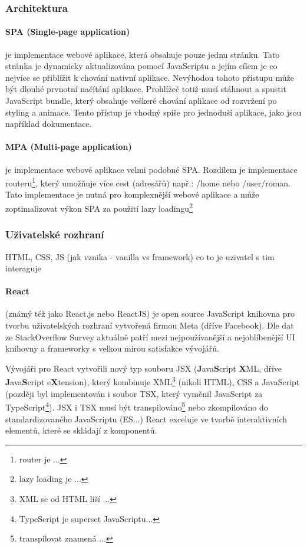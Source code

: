 \documentclass[12pt, a4paper]{article}
\begin{document}
\subsubsection{Architektura}
\paragraph{SPA (Single-page application)}
je implementace webové aplikace, která obsahuje pouze jednu stránku. Tato stránka je dynamicky aktualizována pomocí JavaScriptu a jejím cílem je co nejvíce se přiblížit k chování nativní aplikace. Nevýhodou tohoto přístupu může být dlouhé prvnotní načítání aplikace. Prohlížeč totiž musí stáhnout a spustit JavaScript bundle, který obsahuje veškeré chování aplikace od rozvržení po styling a animace. Tento přístup je vhodný spíše pro jednoduší aplikace, jako jsou například dokumentace. \cite{mozilla_foundation_spa_2023}
\paragraph{MPA (Multi-page application)}
je implementace webové aplikace velmi podobné SPA. Rozdílem je implementace routeru\footnote{router je ...}, který umožňuje více cest (adresářů) např.: /home nebo /user/roman. Tato implementace je nutná pro komplexnější webové aplikace a může zoptimalizovat výkon SPA za použití lazy loadingu\footnote{lazy loading je ...}
\subsubsection{Uživatelské rozhraní}
HTML, CSS, JS (jak vznika - vanilla vs framework)
co to je
uzivatel s tim interaguje
\paragraph{React}
(známý též jako React.js nebo ReactJS) je open source JavaScript knihovna pro tvorbu uživatelských rozhraní vytvořená firmou Meta (dříve Facebook). Dle dat ze StackOverflow Survey aktuálně patří mezi nejpoužívanější a nejoblíbenější UI knihovny a frameworky s velkou mírou satisfakce vývojářů.

Vývojáři pro React vytvořili nový typ souboru JSX (\textbf{J}ava\textbf{S}cript \textbf{X}ML, dříve \textbf{J}ava\textbf{S}cript e\textbf{X}tension), který kombinuje XML\footnote{XML se od HTML liší ...} (nikoli HTML), CSS a JavaScript (později byl implementován i soubor TSX, který vyměnil JavaScript za TypeScript\footnote{TypeScript je superset JavaScriptu...}). JSX i TSX musí být transpilováno\footnote{transpilovat znamená ...} nebo zkompilováno do standardizovaného JavaScriptu (ES...)
React exceluje ve tvorbě interaktivních elementů, které se skládají z komponentů. 
\end{document}
